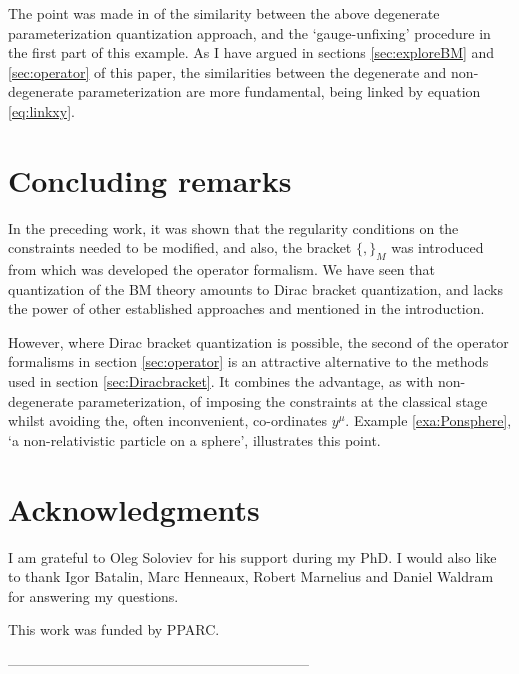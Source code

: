 \documentclass[a4paper,12pt]{article}
\theoremstyle{definition}
\theoremstyle{remark}
\numberwithin{equation}{section}
\begin{document}
{The point was made in \cite{Lyakhovich:2001cm} of the similarity
between the above degenerate parameterization quantization
approach, and the `gauge-unfixing' procedure in the first part of
this example. As I have argued in sections \ref{sec:exploreBM} and
\ref{sec:operator} of this paper, the similarities between the
degenerate and non-degenerate parameterization are more
fundamental, being linked by equation \eqref{eq:linkxy}.
}


\label{exa:Ponsphere}


\section{Concluding remarks}

In the preceding work, it was shown that the regularity conditions
on the constraints needed to be modified, and also, the bracket
$\{,\}_M$ was introduced from which was developed the operator
formalism. We have seen that quantization of the BM theory amounts
to Dirac bracket quantization, and lacks the power of other
established approaches
\cite{Batalin:1987fm,Batalin:1990mb,Batalin:1991jm} and
\cite{Harada:1990aj,Mitra:1990mp} mentioned in the introduction.

However, where Dirac bracket quantization is possible, the second
of the operator formalisms in section \ref{sec:operator} is an
attractive alternative to the methods used in section
\ref{sec:Diracbracket}. It combines the advantage, as with
non-degenerate parameterization, of imposing the constraints at
the classical stage whilst avoiding the, often inconvenient,
co-ordinates $y^\mu$. Example \ref{exa:Ponsphere}, `a
non-relativistic particle on a sphere', illustrates this point.


\medskip
\section*{Acknowledgments}
I am grateful to Oleg Soloviev for his support during my PhD. I
would also like to thank Igor Batalin, Marc Henneaux, Robert
Marnelius and Daniel Waldram for answering my questions.

This work was funded by PPARC.

-----------------------------------------------------------------



\end{document}
